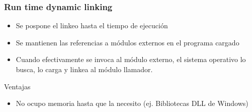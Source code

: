 		\subsubsection{Run time dynamic linking}
			\begin{itemize}
			\item Se pospone el linkeo hasta el tiempo de ejecución
			\item Se mantienen las referencias a módulos externos en el programa cargado
			\item Cuando efectivamente se invoca al módulo externo, el sistema operativo lo busca, lo carga y linkea al módulo llamador.
			\end{itemize}
			
			Ventajas
			\begin{itemize}
			\item No ocupo memoria hasta que la necesito (ej. Bibliotecas DLL de Windows)
			\end{itemize}

